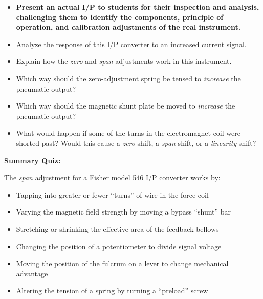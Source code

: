 \begin{itemize}
\item{} {\bf Present an actual I/P to students for their inspection and analysis, challenging them to identify the components, principle of operation, and calibration adjustments of the real instrument.}
\item{} Analyze the response of this I/P converter to an increased current signal.
\item{} Explain how the {\it zero} and {\it span} adjustments work in this instrument.
\item{} Which way should the zero-adjustment spring be tensed to {\it increase} the pneumatic output?
\item{} Which way should the magnetic shunt plate be moved to {\it increase} the pneumatic output?
\item{} What would happen if some of the turns in the electromagnet coil were shorted past?  Would this cause a {\it zero} shift, a {\it span} shift, or a {\it linearity} shift?
\end{itemize}







\vfil \eject

\noindent
{\bf Summary Quiz:}

The {\it span} adjustment for a Fisher model 546 I/P converter works by:

\begin{itemize}
\item{} Tapping into greater or fewer ``turns'' of wire in the force coil
\vskip 5pt
\item{} Varying the magnetic field strength by moving a bypass ``shunt'' bar
\vskip 5pt
\item{} Stretching or shrinking the effective area of the feedback bellows
\vskip 5pt
\item{} Changing the position of a potentiometer to divide signal voltage
\vskip 5pt
\item{} Moving the position of the fulcrum on a lever to change mechanical advantage
\vskip 5pt
\item{} Altering the tension of a spring by turning a ``preload'' screw
\end{itemize}








